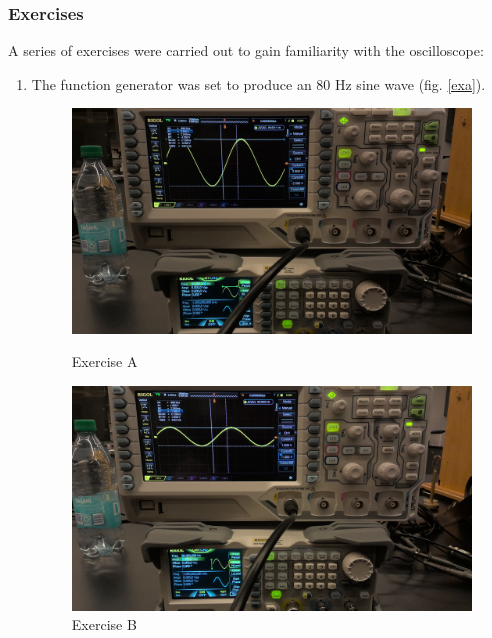 \documentclass{article}
\begin{document}
        \subsubsection{Exercises}
            A series of exercises were carried out to gain familiarity with the oscilloscope:

            \begin{enumerate}[label=(\alph*)]
                \item The function generator was set to produce an 80 Hz sine wave (fig. \ref{exa}).
                \begin{figure}[p]
                    \begin{minipage}{\textwidth/2}
                        \includegraphics[width=\linewidth]{a.jpg}
                        \caption{Exercise A}
                        \label{exa}
                    \end{minipage}
                    \begin{minipage}{\textwidth/2}
                        \includegraphics[width=\linewidth]{b.jpg}
                        \caption{Exercise B}
                        \label{exb}
                    \end{minipage}
                \end{figure}


\end{enumerate}
\end{document}
